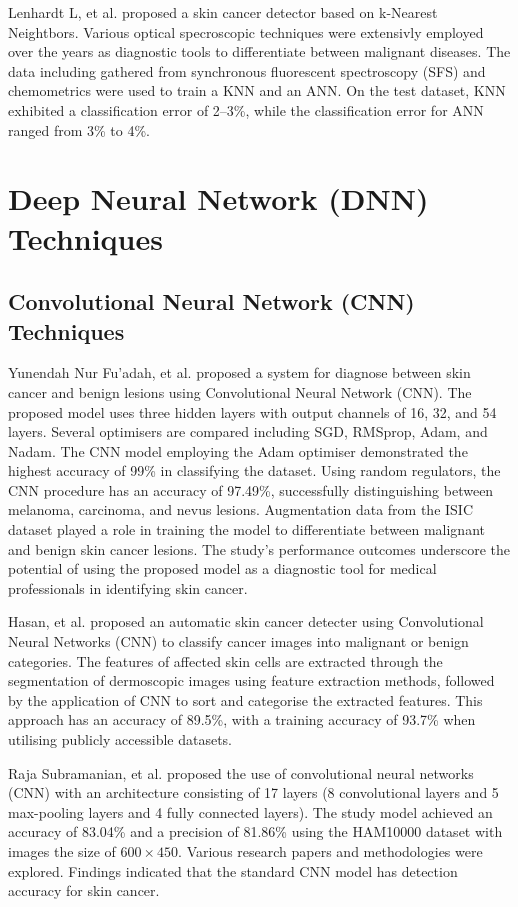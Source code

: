 Lenhardt L, et al.\cite{Lenhardt2013} proposed a skin cancer detector based on k-Nearest Neightbors. Various optical specroscopic techniques were extensivly employed over the years as diagnostic tools to differentiate between malignant diseases. The data including gathered from synchronous fluorescent spectroscopy (SFS) and chemometrics were used to train a KNN and an ANN. On the test dataset, KNN exhibited a classification error of 2–3\%, while the classification error for ANN ranged from 3\% to 4\%.

\section{Deep Neural Network (DNN) Techniques}

\subsection{Convolutional Neural Network (CNN) Techniques}
Yunendah Nur Fu'adah, et al.\cite{Fu2020} proposed a system for diagnose between skin cancer and benign lesions using Convolutional Neural Network (CNN). The proposed model uses three hidden layers with output channels of 16, 32, and 54 layers. Several optimisers are compared including SGD, RMSprop, Adam, and Nadam. The CNN model employing the Adam optimiser demonstrated the highest accuracy of 99\% in classifying the dataset. Using random regulators, the CNN procedure has an accuracy of 97.49\%, successfully distinguishing between melanoma, carcinoma, and nevus lesions. Augmentation data from the ISIC dataset played a role in training the model to differentiate between malignant and benign skin cancer lesions. The study's performance outcomes underscore the potential of using the proposed model as a diagnostic tool for medical professionals in identifying skin cancer.

Hasan, et al.\cite{Bisla2019} proposed an automatic skin cancer detecter using Convolutional Neural Networks (CNN) to classify cancer images into malignant or benign categories. The features of affected skin cells are extracted through the segmentation of dermoscopic images using feature extraction methods, followed by the application of CNN to sort and categorise the extracted features. This approach has an accuracy of 89.5\%, with a training accuracy of 93.7\% when utilising publicly accessible datasets.

Raja Subramanian, et al.\cite{Raja2021} proposed the use of convolutional neural networks (CNN) with an architecture consisting of 17 layers (8 convolutional layers and 5 max-pooling layers and 4 fully connected layers). The study model achieved an accuracy of 83.04\% and a precision of 81.86\% using the HAM10000 dataset with images the size of $600\times450$. Various research papers and methodologies were explored. Findings indicated that the standard CNN model has detection accuracy for skin cancer.

